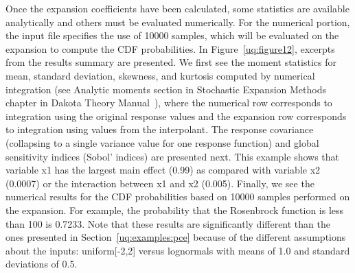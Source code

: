 Once the expansion coefficients have been calculated, some statistics
are available analytically and others must be evaluated numerically.
For the numerical portion, the input file specifies the use of 10000
samples, which will be evaluated on the expansion to compute the CDF
probabilities. In Figure~\ref{uq:figure12}, excerpts from the results
summary are presented. We first see the moment statistics for mean,
standard deviation, skewness, and kurtosis computed by numerical
integration (see Analytic moments section in Stochastic Expansion
Methods chapter in Dakota Theory Manual~\cite{TheoMan}), where the
numerical row corresponds to integration using the original response
values and the expansion row corresponds to integration using values
from the interpolant. The response covariance (collapsing to a single
variance value for one response function) and global sensitivity
indices (Sobol' indices) are presented next. This example shows that
variable x1 has the largest main effect (0.99) as compared with
variable x2 (0.0007) or the interaction between x1 and x2 (0.005).
Finally, we see the numerical results for the CDF probabilities based
on 10000 samples performed on the expansion. For example, the probability 
that the Rosenbrock function is less than 100 is 0.7233. Note that these 
results are significantly different than the ones presented in 
Section~\ref{uq:examples:pce} because of 
the different assumptions about the inputs: uniform[-2,2] versus
lognormals with means of 1.0 and standard deviations of 0.5. 
